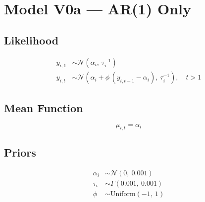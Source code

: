 \documentclass{article}
\begin{document}
\section*{Model V0a --- AR(1) Only}

\subsection*{Likelihood}

\begin{align}
  y_{i,1} &\sim \mathcal{N}(\alpha_i,\ \tau_i^{-1}) \\[6pt]
  y_{i,t} &\sim \mathcal{N}\left(\alpha_i + \phi\,(y_{i,t-1} - \alpha_i),\ \tau_i^{-1}\right), \quad t > 1
\end{align}

\subsection*{Mean Function}

\begin{equation}
  \mu_{i,t} = \alpha_i
\end{equation}

\subsection*{Priors}

\begin{align}
  \alpha_i &\sim \mathcal{N}(0,\ 0.001) \\
  \tau_i &\sim \Gamma(0.001,\ 0.001) \\
  \phi &\sim \mathrm{Uniform}(-1,\ 1)
\end{align}
\end{document}
